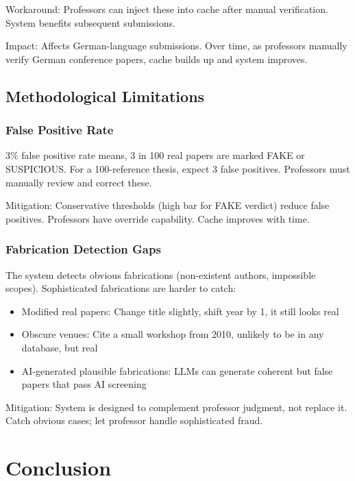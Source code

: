\documentclass[12pt,a4paper,oneside]{report}
\begin{document}
Workaround: Professors can inject these into cache after manual verification. System benefits subsequent submissions.

Impact: Affects German-language submissions. Over time, as professors manually verify German conference papers, cache builds up and system improves.

\section{Methodological Limitations}

\subsection{False Positive Rate}

3\% false positive rate means, 3 in 100 real papers are marked FAKE or SUSPICIOUS. For a 100-reference thesis, expect 3 false positives. Professors must manually review and correct these.

Mitigation: Conservative thresholds (high bar for FAKE verdict) reduce false positives. Professors have override capability. Cache improves with time.

\subsection{Fabrication Detection Gaps}

The system detects obvious fabrications (non-existent authors, impossible scopes). Sophisticated fabrications are harder to catch:
\begin{itemize}
    \item Modified real papers: Change title slightly, shift year by 1, it still looks real
    \item Obscure venues: Cite a small workshop from 2010, unlikely to be in any database, but real
    \item AI-generated plausible fabrications: LLMs can generate coherent but false papers that pass AI screening
\end{itemize}

Mitigation: System is designed to complement professor judgment, not replace it. Catch obvious cases; let professor handle sophisticated fraud.

\chapter{Conclusion}
\end{document}
